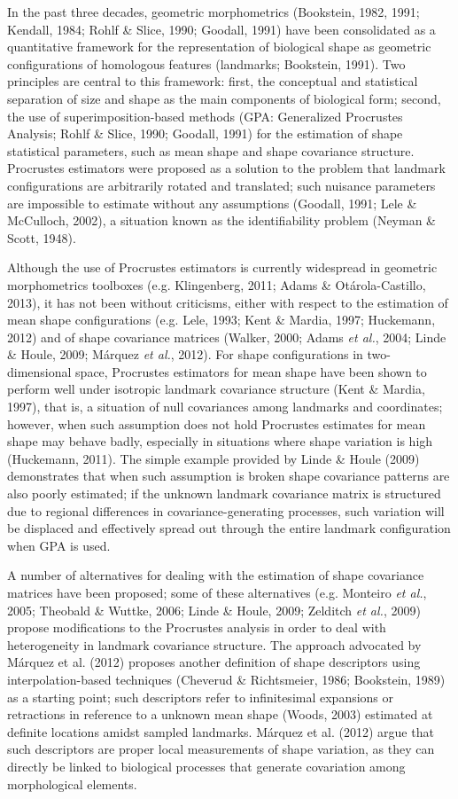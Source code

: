 \documentclass[12pt,]{article}
\begin{document}
In the past three decades, geometric morphometrics (Bookstein, 1982,
1991; Kendall, 1984; Rohlf \& Slice, 1990; Goodall, 1991) have been
consolidated as a quantitative framework for the representation of
biological shape as geometric configurations of homologous features
(landmarks; Bookstein, 1991). Two principles are central to this
framework: first, the conceptual and statistical separation of size and
shape as the main components of biological form; second, the use of
superimposition-based methods (GPA: Generalized Procrustes Analysis;
Rohlf \& Slice, 1990; Goodall, 1991) for the estimation of shape
statistical parameters, such as mean shape and shape covariance
structure. Procrustes estimators were proposed as a solution to the
problem that landmark configurations are arbitrarily rotated and
translated; such nuisance parameters are impossible to estimate without
any assumptions (Goodall, 1991; Lele \& McCulloch, 2002), a situation
known as the identifiability problem (Neyman \& Scott, 1948).

Although the use of Procrustes estimators is currently widespread in
geometric morphometrics toolboxes (e.g. Klingenberg, 2011; Adams \&
Otárola-Castillo, 2013), it has not been without criticisms, either with
respect to the estimation of mean shape configurations (e.g. Lele, 1993;
Kent \& Mardia, 1997; Huckemann, 2012) and of shape covariance matrices
(Walker, 2000; Adams \emph{et al.}, 2004; Linde \& Houle, 2009; Márquez
\emph{et al.}, 2012). For shape configurations in two-dimensional space,
Procrustes estimators for mean shape have been shown to perform well
under isotropic landmark covariance structure (Kent \& Mardia, 1997),
that is, a situation of null covariances among landmarks and
coordinates; however, when such assumption does not hold Procrustes
estimates for mean shape may behave badly, especially in situations
where shape variation is high (Huckemann, 2011). The simple example
provided by Linde \& Houle (2009) demonstrates that when such assumption
is broken shape covariance patterns are also poorly estimated; if the
unknown landmark covariance matrix is structured due to regional
differences in covariance-generating processes, such variation will be
displaced and effectively spread out through the entire landmark
configuration when GPA is used.

A number of alternatives for dealing with the estimation of shape
covariance matrices have been proposed; some of these alternatives (e.g.
Monteiro \emph{et al.}, 2005; Theobald \& Wuttke, 2006; Linde \& Houle,
2009; Zelditch \emph{et al.}, 2009) propose modifications to the
Procrustes analysis in order to deal with heterogeneity in landmark
covariance structure. The approach advocated by Márquez et al. (2012)
proposes another definition of shape descriptors using
interpolation-based techniques (Cheverud \& Richtsmeier, 1986;
Bookstein, 1989) as a starting point; such descriptors refer to
infinitesimal expansions or retractions in reference to a unknown mean
shape (Woods, 2003) estimated at definite locations amidst sampled
landmarks. Márquez et al. (2012) argue that such descriptors are proper
local measurements of shape variation, as they can directly be linked to
biological processes that generate covariation among morphological
elements.
\end{document}
